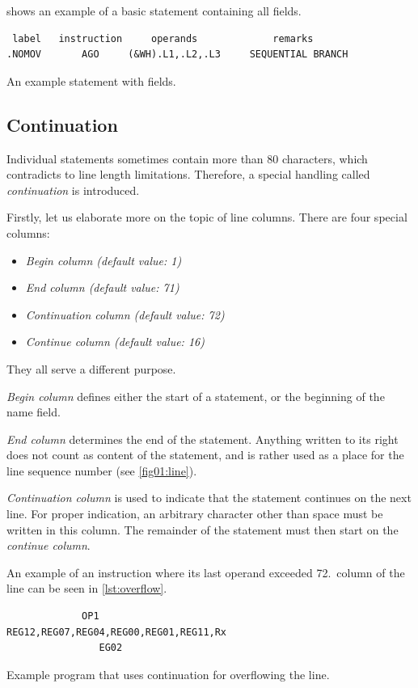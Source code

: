  shows an example of a basic statement containing all fields.
\begin{listing}

\begin{verbatim}
 label   instruction     operands             remarks
.NOMOV       AGO     (&WH).L1,.L2,.L3     SEQUENTIAL BRANCH
\end{verbatim}
\caption{An example statement with fields.}
\label{lst:small_example}
\end{listing}

\subsection{Continuation}

Individual statements sometimes contain more than 80 characters, which contradicts to line length limitations. Therefore, a special handling called \emph{continuation} is introduced.

Firstly, let us elaborate more on the topic of line columns. There are four special columns:
\begin{itemize}
	\item \emph{Begin column (default value: 1)}
	
	\item \emph{End column (default value: 71)}
	
	\item \emph{Continuation column (default value: 72)}
	
	\item \emph{Continue column (default value: 16)}
\end{itemize}
They all serve a different purpose.

\emph{Begin column} defines either the start of a statement, or the beginning of the name field.

\emph{End column} determines the end of the statement. Anything written to its right does not count as content of the statement, and is rather used as a place for the line sequence number (see \cref{fig01:line}). 

\emph{Continuation column} is used to indicate that the statement continues on the next line. For proper indication, an arbitrary character other than space must be written in this column. The remainder of the statement must then start on the \emph{continue column}.

An example of an instruction where its last operand exceeded 72.~column of the line can be seen in \cref{lst:overflow}.
\begin{listing}
	\begin{verbatim}
             OP1                   REG12,REG07,REG04,REG00,REG01,REG11,Rx
                EG02
	\end{verbatim}
	\caption{Example program that uses continuation for overflowing the line.}
	\label{lst:overflow}
\end{listing}

